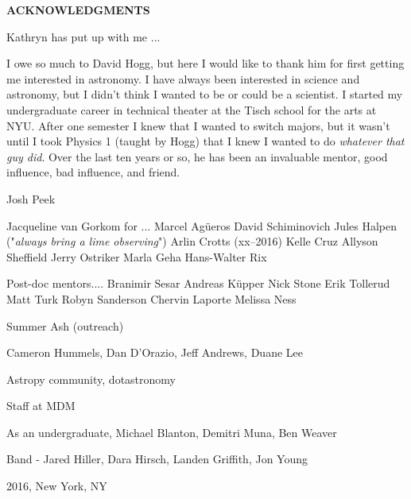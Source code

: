 \newpage

\begin{center}

{\large \bf ACKNOWLEDGMENTS }

\end{center}

\vspace{0.8cm}

Kathryn has put up with me ...

I owe so much to David Hogg, but here I would like to thank him for first getting me interested in astronomy. I have always been interested in science and astronomy, but I didn't think I wanted to be or could be a scientist. I started my undergraduate career in technical theater at the Tisch school for the arts at NYU. After one semester I knew that I wanted to switch majors, but it wasn't until I took Physics 1 (taught by Hogg) that I knew I wanted to do \emph{whatever that guy did}. Over the last ten years or so, he has been an invaluable mentor, good influence, bad influence, and friend.

Josh Peek

Jacqueline van Gorkom for ...
Marcel Ag\"ueros
David Schiminovich
Jules Halpen ("\emph{always bring a lime observing}")
Arlin Crotts (xx--2016)
Kelle Cruz
Allyson Sheffield
Jerry Ostriker
Marla Geha
Hans-Walter Rix

Post-doc mentors....
Branimir Sesar
Andreas K\"upper
Nick Stone
Erik Tollerud
Matt Turk
Robyn Sanderson
Chervin Laporte
Melissa Ness

Summer Ash (outreach)

Cameron Hummels, Dan D'Orazio, Jeff Andrews, Duane Lee

Astropy community, dotastronomy

Staff at MDM

As an undergraduate, Michael Blanton, Demitri Muna, Ben Weaver

Band - Jared Hiller, Dara Hirsch, Landen Griffith, Jon Young

\vspace{1.8cm}
2016, New York, NY

